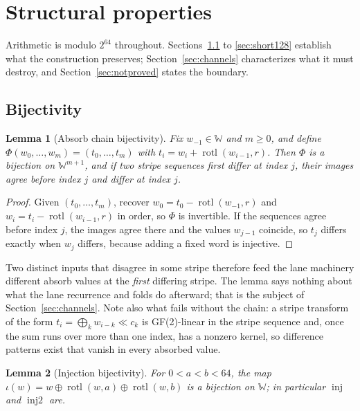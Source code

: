 \documentclass[10pt,a4paper]{article}
\newtheorem{lemma}{Lemma}
\theoremstyle{remark}
\newcommand{\rotl}{\operatorname{rotl}}
\newcommand{\inj}{\operatorname{inj}}
\newcommand{\injb}{\operatorname{inj2}}
\newcommand{\W}{\mathbb{W}}
\begin{document}
\section{Structural properties}
\label{sec:properties}

Arithmetic is modulo \(2^{64}\) throughout.  Sections~\ref{sec:bijectivity}
to \ref{sec:short128} establish what the construction preserves;
Section~\ref{sec:channels} characterizes what it must destroy, and
Section~\ref{sec:notproved} states the boundary.

\subsection{Bijectivity}
\label{sec:bijectivity}

\begin{lemma}[Absorb chain bijectivity]
\label{lem:chain}
Fix \(w_{-1} \in \W\) and \(m \geq 0\), and define
\(\Phi(w_0,\ldots,w_m) = (t_0,\ldots,t_m)\) with
\(t_i = w_i + \rotl(w_{i-1},r)\).  Then \(\Phi\) is a bijection on
\(\W^{m+1}\), and if two stripe sequences first differ at index \(j\), their
images agree before index \(j\) and differ at index \(j\).
\end{lemma}

\begin{proof}
Given \((t_0,\ldots,t_m)\), recover \(w_0 = t_0 - \rotl(w_{-1},r)\) and
\(w_i = t_i - \rotl(w_{i-1},r)\) in order, so \(\Phi\) is invertible.  If the
sequences agree before index \(j\), the images agree there and the values
\(w_{j-1}\) coincide, so \(t_j\) differs exactly when \(w_j\) differs,
because adding a fixed word is injective.
\end{proof}

Two distinct inputs that disagree in some stripe therefore feed the lane
machinery different absorb values at the \emph{first} differing stripe.  The
lemma says nothing about what the lane recurrence and folds do afterward;
that is the subject of Section~\ref{sec:channels}.  Note also what fails
without the chain: a stripe transform of the form
\(t_i = \bigoplus_k w_{i-k}\!\ll\! c_k\) is GF(2)-linear in the stripe
sequence and, once the sum runs over more than one index, has a nonzero
kernel, so difference patterns exist that vanish in every absorbed value.

\begin{lemma}[Injection bijectivity]
\label{lem:inj}
For \(0 < a < b < 64\), the map
\(\iota(w) = w \oplus \rotl(w,a) \oplus \rotl(w,b)\) is a bijection on \(\W\);
in particular \(\inj\) and \(\injb\) are.
\end{lemma}
\end{document}
